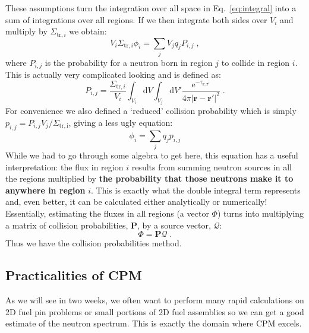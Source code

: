 \documentclass{article}
\begin{document}
These assumptions turn the integration over all space in Eq.~\eqref{eq:integral} into a sum of integrations over all regions. If we then integrate both sides over $V_i$ and multiply by $\Sigma_{\mathrm{tr},i}$ we obtain:
\begin{equation}
    V_i \Sigma_{\mathrm{tr},i} \phi_i = \sum_j V_j q_j P_{i,j}\;\mathrm{,} 
\end{equation}
where $P_{i,j}$ is the probability for a neutron born in region $j$ to collide in region $i$. This is actually very complicated looking and is defined as:
\begin{equation}
    P_{i,j} = \frac{\Sigma_{\mathrm{tr},i}}{V_i}\int_{V_i}\mathrm{d}V\int_{V_j}\mathrm{d}V' \frac{\mathrm{e}^{-\tau_{\mathbf{r},\mathbf{r}'}}}{4\pi|\mathbf{r}-\mathbf{r'}|^2}\;\mathrm{.}
\end{equation}
For convenience we also defined a `reduced' collision probability which is simply $p_{i,j}=P_{i,j}V_{j}/\Sigma_\mathrm{tr,i}$, giving a less ugly equation:
\begin{equation}
    \phi_i = \sum_j q_j p_{i,j}
\end{equation}
While we had to go through some algebra to get here, this equation has a useful interpretation: the flux in region $i$ results from summing neutron sources in all the regions multiplied by \textbf{the probability that those neutrons make it to anywhere in region} $i$. This is exactly what the double integral term represents and, even better, it can be calculated either analytically or numerically! Essentially, estimating the fluxes in all regions (a vector $\Phi$) turns into multiplying a matrix of collision probabilities, $\mathbf{P}$, by a source vector, $\mathcal{Q}$:
\begin{equation}
    \Phi = \mathbf{P}\mathcal{Q}\;\mathrm{.}
\end{equation}
Thus we have the collision probabilities method.




\subsection{Practicalities of CPM}

As we will see in two weeks, we often want to perform many rapid calculations on 2D fuel pin problems or small portions of 2D fuel assemblies so we can get a good estimate of the neutron spectrum. This is exactly the domain where CPM excels.
\end{document}
